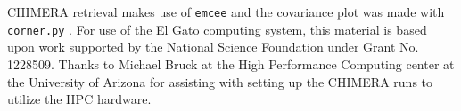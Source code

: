\documentclass[iop]{emulateapj}
\begin{document}
CHIMERA retrieval makes use of \texttt{emcee} \citep{foreman-mackey2013emcee} and the covariance plot was made with \texttt{corner.py} \citep{foremanCorner}.
For use of the El Gato computing system, this material is based upon work supported by the National Science Foundation under Grant No. 1228509.
Thanks to Michael Bruck at the High Performance Computing center at the University of Arizona for assisting with setting up the CHIMERA runs to utilize the HPC hardware.








\end{document}
